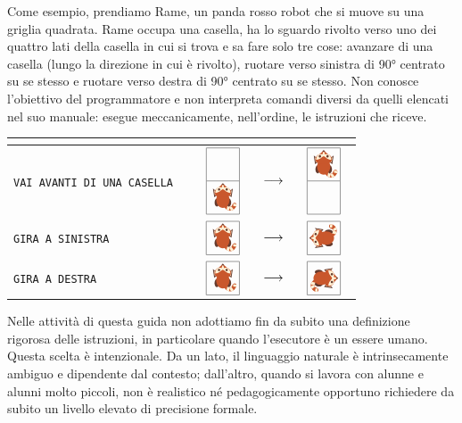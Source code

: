 Come esempio, prendiamo Rame, un panda rosso robot che si muove su una griglia quadrata. Rame occupa una casella, ha lo sguardo rivolto verso uno dei quattro lati della casella in cui si trova e sa fare solo tre cose: avanzare di una casella (lungo la direzione in cui è rivolto), ruotare verso sinistra di 90° centrato su se stesso e ruotare verso destra di 90° centrato su se stesso. Non conosce l'obiettivo del programmatore e non interpreta comandi diversi da quelli elencati nel suo manuale: esegue meccanicamente, nell'ordine, le istruzioni che riceve.
\begin{center}
\manualeimpostazioni
\newcommand{\ramefigura}[1]{\vcenter{\hbox{\scalebox{1.8}{#1}}}}
\newcommand{\ramecella}[1]{#1}
\begin{tabular}{|J{\arrayrulewidth/3\relax}|K{\arrayrulewidth/3\relax}|K{\arrayrulewidth/3\relax}|}
\hline
{}
 &
 \\
\hline
\texttt{VAI AVANTI DI UNA CASELLA} & \ramecella{\scalebox{1.8}{\iconAvanti}} &
\ramecella{\(\ramefigura{\minigrigliarame{1}{2}{0}{0}{0}} \quad\longrightarrow\quad \ramefigura{\minigrigliarame{1}{2}{0}{1}{0}}\)} \\
\hline
\texttt{GIRA A SINISTRA} & \ramecella{\scalebox{1.8}{\iconSx}} &
\ramecella{\(\ramefigura{\minigrigliarame{1}{1}{0}{0}{0}} \quad\longrightarrow\quad \ramefigura{\minigrigliarame{1}{1}{0}{0}{90}}\)} \\
\hline
\texttt{GIRA A DESTRA} & \ramecella{\scalebox{1.8}{\iconDx}} &
\ramecella{\(\ramefigura{\minigrigliarame{1}{1}{0}{0}{0}} \quad\longrightarrow\quad \ramefigura{\minigrigliarame{1}{1}{0}{0}{-90}}\)} \\
\hline
\end{tabular}
\manualeripristinacolore
\end{center}

\medskip

Nelle attività di questa guida non adottiamo fin da subito una definizione rigorosa delle istruzioni, in particolare quando l'esecutore è un essere umano. Questa scelta è intenzionale. Da un lato, il linguaggio naturale è intrinsecamente ambiguo e dipendente dal contesto; dall'altro, quando si lavora con alunne e alunni molto piccoli, non è realistico né pedagogicamente opportuno richiedere da subito un livello elevato di precisione formale.

